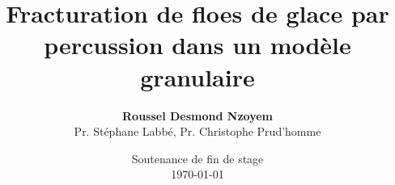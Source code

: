 \documentclass[compress]{beamer}
\begin{document}

\title[\textsc{Fracturation de floes de glace}]{\LARGE Fracturation de floes de glace par percussion dans un modèle granulaire}

\author[Roussel Desmond Nzoyem]{\large \textbf{Roussel Desmond Nzoyem} \\ \vspace*{0.15cm} \small Pr. Stéphane Labbé, Pr. Christophe Prud'homme}



\date[Soutenance de fin de stage 2021]{Soutenance de fin de stage\\\today}


\begingroup



  \begin{frame}[fragile]
    \vspace*{1.5cm}
    \maketitle
  \end{frame}
\endgroup
\end{document}
